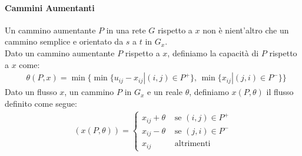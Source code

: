 \documentclass[a4paper,12pt]{article}
\begin{document}
\paragraph{Cammini Aumentanti} Un cammino aumentante $P$ in una rete $G$ rispetto a $x$ non è nient’altro che un cammino semplice e orientato da $s$ a $t$ in $G_x$.\\
Dato un cammino aumentante $P$ rispetto a $x$, definiamo la capacità di $P$ rispetto a $x$ come:
\begin{align*}
  & \theta(P,x) = \min\{\min\{u_{ij} - x_{ij} | (i,j) \in P^+\}, \, \min\{x_{ij} | (j,i) \in P^-\}\}
\end{align*}
Dato un flusso $x$, un cammino $P$ in $G_x$ e un reale $\theta$, definiamo $x(P, \theta)$ il flusso definito come segue:
\begin{align*}
  (x(P, \theta)) = \begin{cases}
    x_{ij} + \theta & \text{ se $(i, j) \in P^+$}\\
    x_{ij} - \theta & \text{ se $(j, i) \in P^-$}\\
    x_{ij} & \text{ altrimenti}
  \end{cases}
\end{align*}
\end{document}
